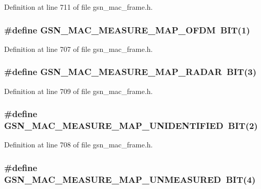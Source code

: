 Definition at line 711 of file gsn\_\-mac\_\-frame.h.

\hypertarget{a00523_a54d4c662a5d471193323c879398e78ab}{
\subsubsection[{GSN\_\-MAC\_\-MEASURE\_\-MAP\_\-OFDM}]{\setlength{\rightskip}{0pt plus 5cm}\#define GSN\_\-MAC\_\-MEASURE\_\-MAP\_\-OFDM~BIT(1)}}
\label{a00523_a54d4c662a5d471193323c879398e78ab}


Definition at line 707 of file gsn\_\-mac\_\-frame.h.

\hypertarget{a00523_a1d623be22401bb5fc2968e007a3b0720}{
\subsubsection[{GSN\_\-MAC\_\-MEASURE\_\-MAP\_\-RADAR}]{\setlength{\rightskip}{0pt plus 5cm}\#define GSN\_\-MAC\_\-MEASURE\_\-MAP\_\-RADAR~BIT(3)}}
\label{a00523_a1d623be22401bb5fc2968e007a3b0720}


Definition at line 709 of file gsn\_\-mac\_\-frame.h.

\hypertarget{a00523_abfaaf646292ca7fad099c48f3bda8966}{
\subsubsection[{GSN\_\-MAC\_\-MEASURE\_\-MAP\_\-UNIDENTIFIED}]{\setlength{\rightskip}{0pt plus 5cm}\#define GSN\_\-MAC\_\-MEASURE\_\-MAP\_\-UNIDENTIFIED~BIT(2)}}
\label{a00523_abfaaf646292ca7fad099c48f3bda8966}


Definition at line 708 of file gsn\_\-mac\_\-frame.h.

\hypertarget{a00523_a476d0c3de5d9e04f86c10a0772c2c9b5}{
\subsubsection[{GSN\_\-MAC\_\-MEASURE\_\-MAP\_\-UNMEASURED}]{\setlength{\rightskip}{0pt plus 5cm}\#define GSN\_\-MAC\_\-MEASURE\_\-MAP\_\-UNMEASURED~BIT(4)}}
\label{a00523_a476d0c3de5d9e04f86c10a0772c2c9b5}


